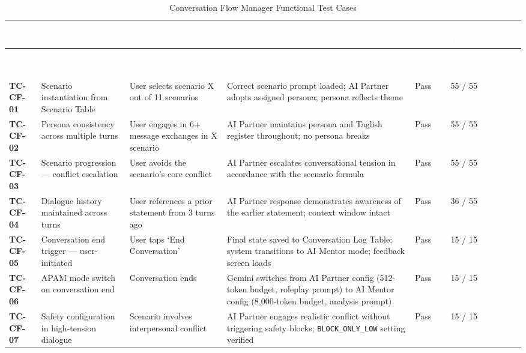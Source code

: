 \begin{longtable}{>{\bfseries}p{1.2cm} p{3.0cm} p{3.5cm} p{4.5cm} p{1.0cm} p{1.5cm}}
\caption{Conversation Flow Manager Functional Test Cases}
\label{tab:tc-cf} \\
 
\rowcolor{headerblue}
\textcolor{white}{\textbf{TC-CF}} &
\textcolor{white}{\textbf{Test Description}} &
\textcolor{white}{\textbf{Input / Trigger}} &
\textcolor{white}{\textbf{Expected Output}} &
\textcolor{white}{\textbf{Result}} &
\textcolor{white}{\textbf{Stress Test (Pass/Total)}} \\
\endfirsthead
 
\multicolumn{6}{c}{\tablename\ \thetable{} -- continued} \\
\rowcolor{headerblue}
\textcolor{white}{\textbf{TC-CF}} &
\textcolor{white}{\textbf{Test Description}} &
\textcolor{white}{\textbf{Input / Trigger}} &
\textcolor{white}{\textbf{Expected Output}} &
\textcolor{white}{\textbf{Result}} &
\textcolor{white}{\textbf{Stress Test (Pass/Total)}} \\
\endhead
 
\midrule
TC-CF-01 & Scenario instantiation from Scenario Table & User selects scenario X out of 11 scenarios & Correct scenario prompt loaded; AI Partner adopts assigned persona; persona reflects theme & Pass & 55 / 55 \\
\midrule
TC-CF-02 & Persona consistency across multiple turns & User engages in 6+ message exchanges in X scenario & AI Partner maintains persona and Taglish register throughout; no persona breaks & Pass & 55 / 55 \\
\midrule
TC-CF-03 & Scenario progression --- conflict escalation & User avoids the scenario's core conflict & AI Partner escalates conversational tension in accordance with the scenario formula & Pass & 55 / 55 \\
\midrule
TC-CF-04 & Dialogue history maintained across turns & User references a prior statement from 3 turns ago & AI Partner response demonstrates awareness of the earlier statement; context window intact & Pass & 36 / 55 \\
\midrule
TC-CF-05 & Conversation end trigger --- user-initiated & User taps `End Conversation' & Final state saved to Conversation Log Table; system transitions to AI Mentor mode; feedback screen loads & Pass & 15 / 15 \\
\midrule
TC-CF-06 & APAM mode switch on conversation end & Conversation ends & Gemini switches from AI Partner config (512-token budget, roleplay prompt) to AI Mentor config (8,000-token budget, analysis prompt) & Pass & 15 / 15 \\
\midrule
TC-CF-07 & Safety configuration in high-tension dialogue & Scenario involves interpersonal conflict & AI Partner engages realistic conflict without triggering safety blocks; \texttt{BLOCK\_ONLY\_LOW} setting verified & Pass & 15 / 15 \\
\bottomrule
\end{longtable}

